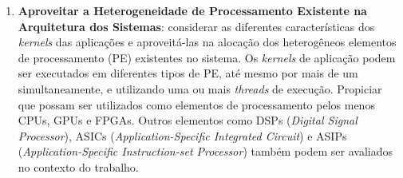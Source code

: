 \documentclass[tese-proposta,nocipinfo]{texufpel}
\begin{document}
\begin{enumerate}
\item \textbf{\label{Aproveitar a Heterogeneidade de Processamento Existente na Arquitetura dos Sistemas}Aproveitar a Heterogeneidade de Processamento Existente na Arquitetura dos Sistemas}: considerar as diferentes características dos \textit{kernels} das aplicações e aproveitá-las na alocação dos heterogêneos elementos de processamento (PE) existentes no sistema. Os \textit{kernels} de aplicação podem ser executados em diferentes tipos de PE, até mesmo por mais de um simultaneamente, e utilizando uma ou mais \textit{threads} de execução. Propiciar que possam ser utilizados como elementos de processamento pelos menos CPUs, GPUs e FPGAs. Outros elementos como DSPs (\textit{Digital Signal Processor}), ASICs (\textit{Application-Specific Integrated Circuit}) e ASIPs (\textit{Application-Specific Instruction-set Processor}) também podem ser avaliados no contexto do trabalho.


\end{enumerate}


\end{document}
